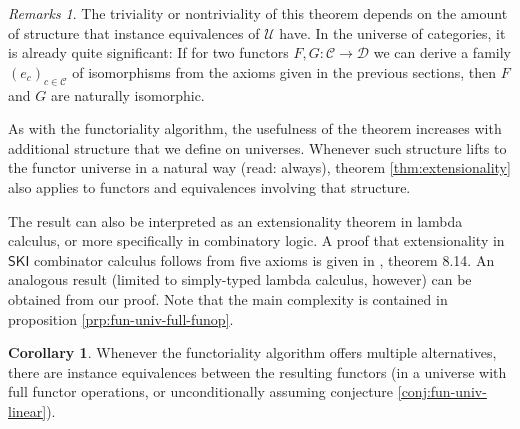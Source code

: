 \documentclass[a4paper]{article}
\theoremstyle{definition}
\newtheorem{corollary}[definition]{Corollary}
\theoremstyle{remark}
\newtheorem*{remarks}{Remarks}
\newcommand{\C}{\mathcal{C}}
\newcommand{\D}{\mathcal{D}}
\newcommand{\U}{\mathcal{U}}
\newcommand{\nm}{\mathsf}
\begin{document}
\begin{remarks}
  The triviality or nontriviality of this theorem depends on the amount of structure
  that instance equivalences of $\U$ have. In the universe of categories, it is
  already quite significant: If for two functors $F,G : \C \to \D$ we can derive a
  family $(e_c)_{c \in \C}$ of isomorphisms from the axioms given in the previous
  sections, then $F$ and $G$ are naturally isomorphic.

  As with the functoriality algorithm, the usefulness of the theorem increases with
  additional structure that we define on universes. Whenever such structure lifts
  to the functor universe in a natural way (read: always), theorem \ref{thm:extensionality}
  also applies to functors and equivalences involving that structure.

  The result can also be interpreted as an extensionality theorem in lambda calculus,
  or more specifically in combinatory logic. A proof that extensionality in $\nm{SKI}$
  combinator calculus follows from five axioms is given in \cite{hindley-seldin},
  theorem 8.14. An analogous result (limited to simply-typed lambda calculus,
  however) can be obtained from our proof. Note that the main complexity is contained
  in proposition \ref{prp:fun-univ-full-funop}.
\end{remarks}

\begin{corollary}
  Whenever the functoriality algorithm offers multiple alternatives, there are instance
  equivalences between the resulting functors (in a universe with full functor
  operations, or unconditionally assuming conjecture \ref{conj:fun-univ-linear}).
\end{corollary}
\end{document}
